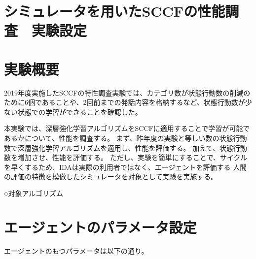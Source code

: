 \documentclass[11pt,a4paper]{jsarticle}
\begin{document}
%
%
\section*{シミュレータを用いたSCCFの性能調査　実験設定}
\section{実験概要}

2019年度実施したSCCFの特性調査実験では、カテゴリ数が状態行動数の削減のために6個であることや、2回前までの発話内容を格納するなど、状態行動数が少ない状態での学習ができることを確認した。

本実験では、深層強化学習アルゴリズムをSCCFに適用することで学習が可能であるかについて、性能を調査する。
まず、昨年度の実験と等しい数の状態行動数で深層強化学習アルゴリズムを適用し、性能を評価する。
加えて、状態行動数を増加させ、性能を評価する。
ただし、実験を簡単にすることで、サイクルを早くするため、IDAは実際の利用者ではなく、エージェントを評価する
人間の評価の特徴を模倣したシミュレータを対象として実験を実施する。

○対象アルゴリズム
\vspace{-0.5\baselineskip}{           %
\begin{itemize}
    \item REINFORCE
    \item Deep-Q-Network (DQN)
    \item Double DQN
    \item Dueling Network
    \item PPO(Proximal Policy Optimization Algorithms)など
    \item その他、時間があれば以下の環境で色々試したいです。
\end{itemize}
}

\section{エージェントのパラメータ設定}
エージェントのもつパラメータは以下の通り。

\end{document}
